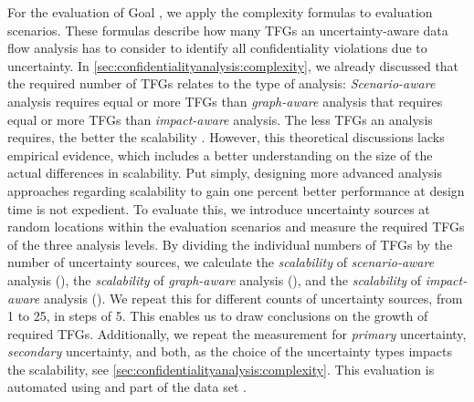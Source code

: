 For the evaluation of Goal , we apply the complexity formulas to evaluation scenarios. These formulas describe how many \acp{TFG} an uncertainty-aware data flow analysis has to consider to identify all confidentiality violations due to uncertainty.
In \autoref{sec:confidentialityanalysis:complexity}, we already discussed that the required number of \acp{TFG} relates to the type of analysis: \emph{Scenario-aware} analysis requires equal or more \acp{TFG} than \emph{graph-aware} analysis that requires equal or more \acp{TFG} than \emph{impact-aware} analysis.
The less \acp{TFG} an analysis requires, the better the scalability \cite{schwickerath_tool-supported_2023}.
However, this theoretical discussions lacks empirical evidence, which includes a better understanding on the size of the actual differences in scalability.
Put simply, designing more advanced analysis approaches regarding scalability to gain one percent better performance at design time is not expedient.
To evaluate this, we introduce uncertainty sources at random locations within the evaluation scenarios and measure the required \acp{TFG} of the three analysis levels.
By dividing the individual numbers of \acp{TFG} by the number of uncertainty sources, we calculate the \emph{scalability} of \emph{scenario-aware} analysis (), the \emph{scalability} of \emph{graph-aware} analysis (), and the \emph{scalability} of \emph{impact-aware} analysis ().
We repeat this for different counts of uncertainty sources, from 1 to 25, in steps of 5.
This enables us to draw conclusions on the growth of required \acp{TFG}.
Additionally, we repeat the measurement for \emph{primary} uncertainty, \emph{secondary} uncertainty, and both, as the choice of the uncertainty types impacts the scalability, see \autoref{sec:confidentialityanalysis:complexity}.
This evaluation is automated using \abunai and part of the data set \cite{dataset}. 

